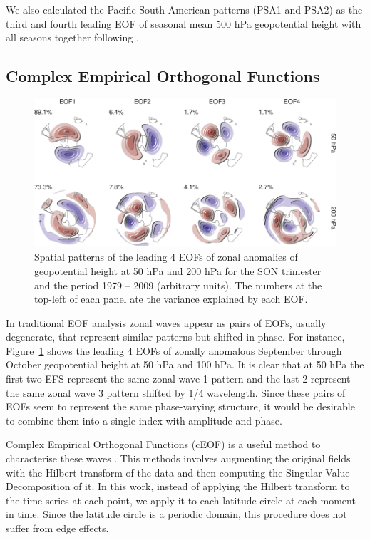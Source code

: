 \documentclass[smallextended]{svjour3}       %
\begin{document}
We also calculated the Pacific South American patterns (PSA1 and PSA2) as the third and fourth leading EOF of seasonal mean 500 hPa geopotential height with all seasons together following \citet{mo2001}.

\hypertarget{complex-empirical-orthogonal-functions}{%
\subsection{Complex Empirical Orthogonal Functions}\label{complex-empirical-orthogonal-functions}}



\begin{figure}
\centering
\includegraphics{../figures/eof-naive-1.pdf}
\caption{\label{fig:eof-naive}Spatial patterns of the leading 4 EOFs of zonal anomalies of geopotential height at 50 hPa and 200 hPa for the SON trimester and the period 1979 -- 2009 (arbitrary units). The numbers at the top-left of each panel ate the variance explained by each EOF.}
\end{figure}

In traditional EOF analysis zonal waves appear as pairs of EOFs, usually degenerate, that represent similar patterns but shifted in phase. For instance, Figure~\ref{fig:eof-naive} shows the leading 4 EOFs of zonally anomalous September through October geopotential height at 50 hPa and 100 hPa. It is clear that at 50 hPa the first two EFS represent the same zonal wave 1 pattern and the last 2 represent the same zonal wave 3 pattern shifted by 1/4 wavelength. Since these pairs of EOFs seem to represent the same phase-varying structure, it would be desirable to combine them into a single index with amplitude and phase.

Complex Empirical Orthogonal Functions (cEOF) is a useful method to characterise these waves \citep{horel1984}. This methods involves augmenting the original fields with the Hilbert transform of the data and then computing the Singular Value Decomposition of it. In this work, instead of applying the Hilbert transform to the time series at each point, we apply it to each latitude circle at each moment in time. Since the latitude circle is a periodic domain, this procedure does not suffer from edge effects.
\end{document}
